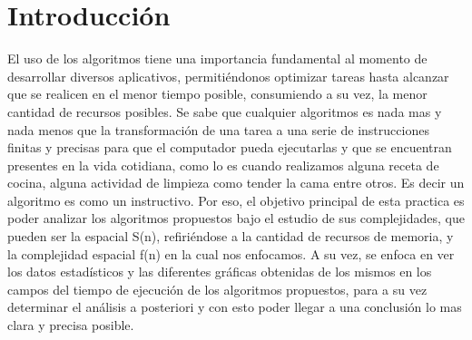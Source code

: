 \documentclass[12pt,twoside]{article}
\begin{document}
\section{Introducci\'on}
El uso de los algoritmos tiene una importancia fundamental al momento de desarrollar diversos aplicativos, permitiéndonos optimizar tareas hasta alcanzar que se realicen en el menor tiempo posible, consumiendo a su vez, la menor cantidad de recursos posibles.
Se sabe que cualquier algoritmos es nada mas y nada menos que la transformación de una tarea a una serie de instrucciones finitas y  precisas para que el computador pueda ejecutarlas y que se encuentran presentes en la vida cotidiana, como lo es cuando realizamos alguna receta de cocina, alguna actividad de limpieza como tender la cama entre otros.
Es decir un algoritmo es como un instructivo.
 Por eso, el objetivo principal de esta practica es poder analizar los algoritmos propuestos bajo el estudio de sus complejidades, que pueden ser la espacial S(n), refiriéndose a la cantidad de recursos de memoria, y la complejidad espacial f(n) en la cual nos enfocamos.
 A su vez, se enfoca en ver los datos estadísticos y las diferentes gráficas obtenidas de los mismos en los campos del tiempo de ejecución de los algoritmos propuestos, para a su vez determinar el análisis a posteriori y con esto poder llegar a una conclusión lo mas clara y precisa posible. 

\newpage
\end{document}
